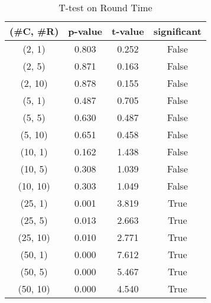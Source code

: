 \begin{table}[h]
\centering
\caption{T-test on Round Time}
\label{tab:t-testRound}
\begin{tabular}{|c|c|c|c|}
\toprule
(\#C, \#R) &  p-value &  t-value &  significant \\
\midrule
  (2, 1) &    0.803 &    0.252 &        False \\
  (2, 5) &    0.871 &    0.163 &        False \\
 (2, 10) &    0.878 &    0.155 &        False \\
  (5, 1) &    0.487 &    0.705 &        False \\
  (5, 5) &    0.630 &    0.487 &        False \\
 (5, 10) &    0.651 &    0.458 &        False \\
 (10, 1) &    0.162 &    1.438 &        False \\
 (10, 5) &    0.308 &    1.039 &        False \\
(10, 10) &    0.303 &    1.049 &        False \\
 (25, 1) &    0.001 &    3.819 &         True \\
 (25, 5) &    0.013 &    2.663 &         True \\
(25, 10) &    0.010 &    2.771 &         True \\
 (50, 1) &    0.000 &    7.612 &         True \\
 (50, 5) &    0.000 &    5.467 &         True \\
(50, 10) &    0.000 &    4.540 &         True \\
\bottomrule
\end{tabular}
\end{table}
